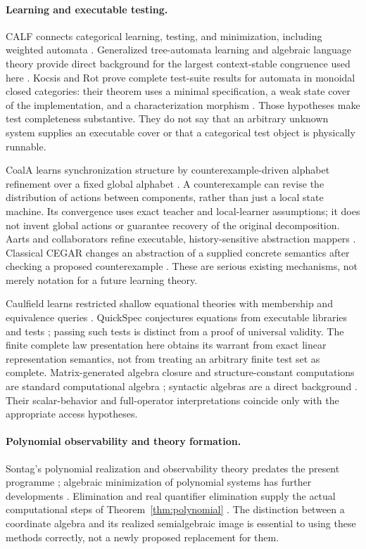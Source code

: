 \documentclass[11pt]{article}
\theoremstyle{definition}
\theoremstyle{remark}\newtheorem{remark}[theorem]{Remark}
\begin{document}
\paragraph{Learning and executable testing.}
CALF connects categorical learning, testing, and minimization, including
weighted automata \cite{calf}. Generalized tree-automata learning and
algebraic language theory provide direct background for the largest
context-stable congruence used here \cite{treecalf,blumensath}.
Kocsis and Rot prove complete test-suite results for automata in monoidal
closed categories: their theorem uses a minimal specification, a weak
state cover of the implementation, and a characterization morphism
\cite{kocsis-rot}. Those hypotheses make test completeness substantive.
They do not say that an arbitrary unknown system supplies an executable
cover or that a categorical test object is physically runnable.

CoalA learns synchronization structure by counterexample-driven alphabet
refinement over a fixed global alphabet \cite{coala}. A counterexample can
revise the distribution of actions between components, rather than just a
local state machine. Its convergence uses exact teacher and local-learner
assumptions; it does not invent global actions or guarantee recovery of the
original decomposition. Aarts and collaborators refine executable,
history-sensitive abstraction mappers \cite{aarts}. Classical CEGAR changes
an abstraction of a supplied concrete semantics after checking a proposed
counterexample \cite{cegar}. These are serious existing mechanisms, not
merely notation for a future learning theory.

Caulfield learns restricted shallow equational theories with membership
and equivalence queries \cite{caulfield}. QuickSpec conjectures equations
from executable libraries and tests \cite{quickspec}; passing such tests is
distinct from a proof of universal validity. The finite complete law
presentation here obtains its warrant from exact linear representation
semantics, not from treating an arbitrary finite test set as complete.
Matrix-generated algebra closure and structure-constant computations are
standard computational algebra \cite{gap}; syntactic algebras are a direct
background \cite{reutenauer}. Their scalar-behavior and full-operator
interpretations coincide only with the appropriate access hypotheses.

\paragraph{Polynomial observability and theory formation.}
Sontag's polynomial realization and observability theory predates the
present programme \cite{sontag}; algebraic minimization of polynomial
systems has further developments \cite{boreale}. Elimination and real
quantifier elimination supply the actual computational steps of
Theorem~\ref{thm:polynomial} \cite{cox,bpr}. The distinction between a
coordinate algebra and its realized semialgebraic image is essential to
using these methods correctly, not a newly proposed replacement for them.
\end{document}
